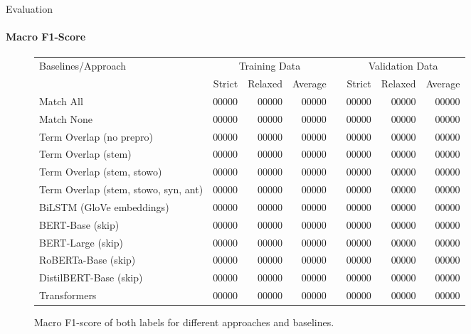\documentclass[english,handout]{mlutalk}
\begin{document}
\begin{frame}{Evaluation}
  \framesubtitle{Macro F1-Score}
  \begin{figure}
    \centering
    \caption{Macro F1-score of both labels for different approaches and baselines.}
    \tiny
    \begin{tabular}{lrrrlrrr}
      \toprule
      Baselines/Approach & \multicolumn{3}{c}{Training Data} & & \multicolumn{3}{c}{Validation Data}\\ \cline{2-4} \cline{6-8}
        & Strict & Relaxed & Average & & Strict & Relaxed & Average\\
      \midrule
      Match All                           & 00000 & 00000 & 00000 & & 00000 & 00000 & 00000\\
      Match None                          & 00000 & 00000 & 00000 & & 00000 & 00000 & 00000\\
      Term Overlap (no prepro)            & 00000 & 00000 & 00000 & & 00000 & 00000 & 00000\\
      Term Overlap (stem)                 & 00000 & 00000 & 00000 & & 00000 & 00000 & 00000\\
      Term Overlap (stem, stowo)          & 00000 & 00000 & 00000 & & 00000 & 00000 & 00000\\
      Term Overlap (stem, stowo, syn, ant)& 00000 & 00000 & 00000 & & 00000 & 00000 & 00000\\
      \midrule
      BiLSTM (GloVe embeddings)           & 00000 & 00000 & 00000 & & 00000 & 00000 & 00000\\
      BERT-Base (skip)                    & 00000 & 00000 & 00000 & & 00000 & 00000 & 00000\\
      BERT-Large (skip)                   & 00000 & 00000 & 00000 & & 00000 & 00000 & 00000\\
      RoBERTa-Base (skip)                 & 00000 & 00000 & 00000 & & 00000 & 00000 & 00000\\
      DistilBERT-Base (skip)              & 00000 & 00000 & 00000 & & 00000 & 00000 & 00000\\
      Transformers                        & 00000 & 00000 & 00000 & & 00000 & 00000 & 00000\\
      \bottomrule
    \end{tabular}
  \end{figure}
\end{frame}

\appendix
\section{\appendixname}

\bibliographyframe
\end{document}
